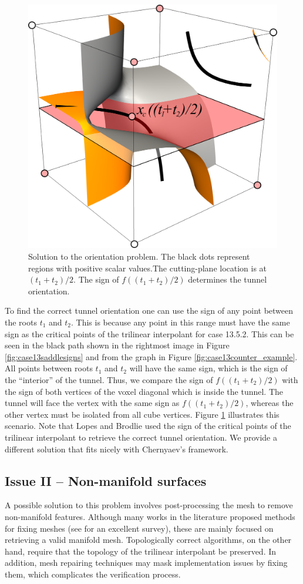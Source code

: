 \begin{figure}[b]
     \centering
     \includegraphics[width=0.5\linewidth]{chapter4/figures/case13/solution.png}
     \caption{Solution to the orientation problem. The black dots represent regions with positive scalar values.The cutting-plane location is at $(t_1 + t_2) / 2$. The sign of $f((t_1+t_2)/2)$ determines the tunnel orientation. }
     \label{fig:solution-case13}
\end{figure}

To find the correct tunnel orientation one can use the sign of any point between the roots $t_1$ and $t_2$. This is because any point in this range must have the same sign as the critical points of the trilinear interpolant for case 13.5.2. This can be seen in the black path shown in the rightmost image in Figure \ref{fig:case13saddlesigns} and from the graph in Figure \ref{fig:case13counter_example}. All points between roots $t_1$ and $t_2$ will have the same sign, which is the sign of the ``interior'' of the tunnel. Thus, we compare the sign of $f((t_1+t_2)/2)$ with the sign of both vertices of the voxel diagonal which is inside the tunnel. The tunnel will face the vertex with the same sign as $f((t_1+t_2)/2)$, whereas the other vertex must be isolated from all cube vertices. Figure \ref{fig:solution-case13} illustrates this scenario. Note that Lopes and Brodlie  \cite{lopes:tvcg:2003} used the sign of the critical points of the trilinear interpolant to retrieve the correct tunnel orientation. We provide a different solution that fits nicely with Chernyaev's framework.


\subsection{Issue II -- Non-manifold surfaces}

A possible solution to this problem involves post-pro\-cessing the mesh to remove non-manifold features. Although  many works in the literature proposed methods for fixing meshes (see \cite{springerlink:10.1007/s11390-009-9206-7} for an excellent survey), these are mainly focused on retrieving a valid manifold mesh. Topologically correct algorithms, on the other hand, require that the topology of the trilinear interpolant  be preserved. In addition, mesh repairing techniques may mask implementation issues by fixing them, which complicates the verification process. 


